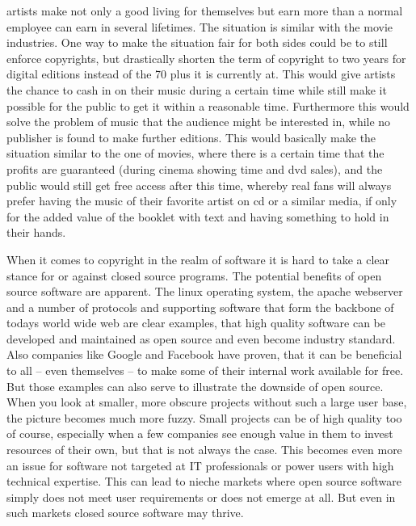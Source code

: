 \documentclass[a4paper]{report}
\begin{document}
artists make not only a good living for themselves but earn more than a normal employee can earn in several lifetimes. The situation is similar with the movie industries. One way to make the situation fair for both sides could be to still enforce copyrights, but drastically shorten the term of copyright to two years for digital editions instead of the 70 plus it is currently at. This would give artists the chance to cash in on their music during a certain time while still make it possible for the public to get it within a reasonable time. Furthermore this would solve the problem of music that the audience might be interested in, while no publisher is found to make further editions. This would basically make the situation similar to the one of movies, where there is a certain time that the profits are guaranteed (during cinema showing time and dvd sales), and the public would still get free access after this time, whereby real fans will always prefer having the music of their favorite artist on cd or a similar media, if only for the added value of the booklet with text and having something to hold in their hands.

When it comes to copyright in the realm of software it is hard to take a clear stance for or against closed source programs. The potential benefits of open source software are apparent. The linux operating system, the apache webserver and a number of protocols and supporting software that form the backbone of todays world wide web are clear examples, that high quality software can be developed and maintained as open source and even become industry standard. Also companies like Google and Facebook have proven, that it can be beneficial to all -- even themselves -- to make some of their internal work available for free. But those examples can also serve to illustrate the downside of open source. When you look at smaller, more obscure projects without such a large user base, the picture becomes much more fuzzy. Small projects can be of high quality too of course, especially when a few companies see enough value in them to invest resources of their own, but that is not always the case. This becomes even more an issue for software not targeted at IT professionals or power users with high technical expertise. This can lead to nieche markets where open source software simply does not meet user requirements or does not emerge at all. But even in such markets closed source software may thrive.


\newpage

\printbibliography
\end{document}
